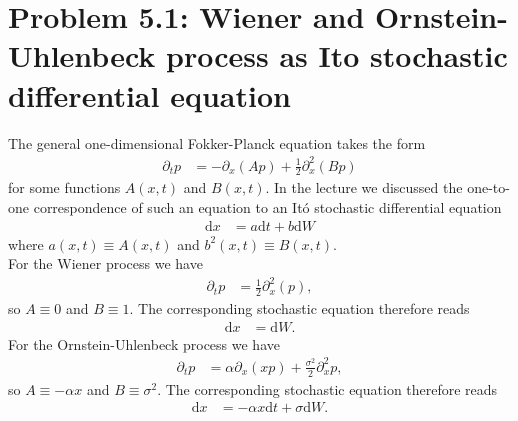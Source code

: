 \documentclass[english, parskip=full]{scrartcl}
\title{\titel}
\author{\autor}
\date{\today}
\newcommand{\kla}{}
\newcommand{\tecxt}{}
\begin{document}
\maketitle  %


\section*{Problem 5.1: Wiener and Ornstein-Uhlenbeck process as Ito stochastic differential equation}
The general one-dimensional Fokker-Planck equation takes the form
\begin{align}
\partial_t p &= - \partial_x \kla\left( {Ap} \right) + \frac{1}{2} \partial_x^2 \kla\left( {Bp} \right)
\end{align}
for some functions $A(x,t)$ and $B(x,t)$.
In the lecture we discussed the one-to-one correspondence of such an equation to an Itó stochastic differential equation
\begin{align}
\tecxt\text{d}x &= a \tecxt\text{d}t + b \tecxt\text{d}W
\end{align}
where $a(x,t)\equiv A(x,t)$ and $b^2(x,t)\equiv B(x,t)$.
\\
For the Wiener process we have
\begin{align}
\partial_t p &= \frac{1}{2} \partial_x^2 \kla\left( {p} \right),
\end{align}
so $A\equiv 0$ and $B\equiv 1$.
The corresponding stochastic equation therefore reads
\begin{align}
\tecxt\text{d}x &= \tecxt\text{d}W.
\end{align}
For the Ornstein-Uhlenbeck process we have
\begin{align}
\partial_t p &= \alpha \partial_x (xp) + \frac{\sigma^2}{2} \partial_x^2 p, 
\end{align}
so $A\equiv -\alpha x$ and $B\equiv \sigma^2$.
The corresponding stochastic equation therefore reads
\begin{align}
\tecxt\text{d}x &= -\alpha x\tecxt\text{d}t + \sigma \tecxt\text{d}W.
\end{align}


\newpage
\end{document}
